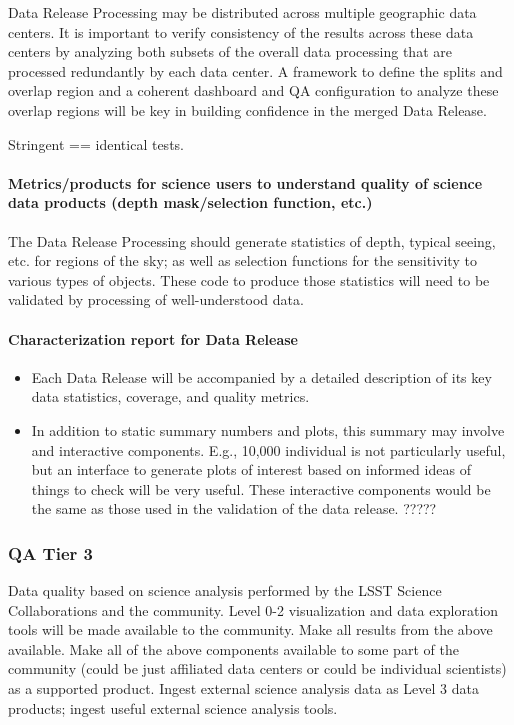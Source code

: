 Data Release Processing may be distributed across multiple geographic data centers.  It is important to verify consistency of the results across these data centers by analyzing both subsets of the overall data processing that are processed redundantly by each data center. A framework to define the splits and overlap region and a coherent dashboard and QA configuration to analyze these overlap regions will be key in building confidence in the merged Data Release.

Stringent == identical tests. 

\paragraph{Metrics/products for science users to understand quality of science data products (depth mask/selection function, etc.)}
\label{sec:qaScienceUsersMetrics}

The Data Release Processing should generate statistics of depth, typical seeing, etc. for regions of the sky; as well as selection functions for the sensitivity to various types of objects.  These code to produce those statistics will need to be validated by processing of well-understood data.


\paragraph{Characterization report for Data Release}
\label{sec:qaCharacterizationReportDrp}
\begin{itemize}
\item Each Data Release will be accompanied by a detailed description of its key data statistics, coverage, and quality metrics.
\item In addition to static summary numbers and plots, this summary may involve and interactive components.  E.g., 10,000 individual is not particularly useful, but an interface to generate plots of interest based on informed ideas of things to check will be very useful. These interactive components would be the same as those used in the validation of the data release. ?????
\end{itemize}

\subsubsection{QA Tier 3}
\label{sec:qaQA3}


Data quality based on science analysis performed by the LSST Science Collaborations and the community. Level 0-2 visualization and data exploration tools will be made available to the community.
Make all results from the above available. Make all of the above components available to some part of the community (could be just affiliated data centers or could be individual scientists) as a supported product.
Ingest external science analysis data as Level 3 data products; ingest useful external science analysis tools.


